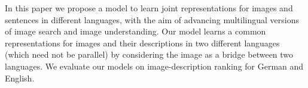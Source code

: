 In this paper we propose a model to learn joint representations for images and sentences in different languages, with the aim of advancing multilingual versions of image search and image understanding. Our model learns a common representations for images and their descriptions in two different languages (which need not be parallel) by considering the image as a bridge between two languages. We evaluate our models on image-description ranking for German and English.
